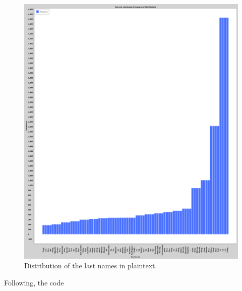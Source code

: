 \begin{figure}[h!]
    \centering
    \includegraphics[width=\textwidth]{03-ex2/Secure_Lastname_Frequency_Distribution_Plain.png}
    \caption{Distribution of the last names in plaintext.}
    \label{fig:Distribution-of-last-names-plain-sec}
\end{figure}

\newpage

Following, the code 

